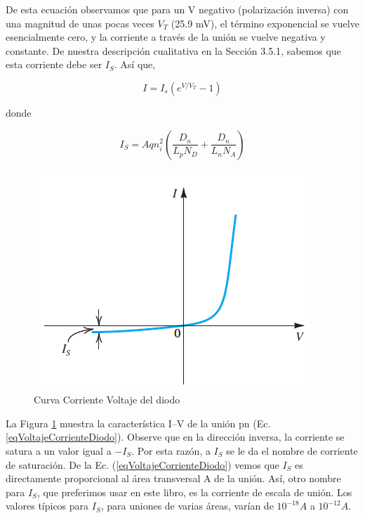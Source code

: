 De esta ecuación observamos que para un V negativo (polarización inversa) con una magnitud de unas pocas veces \(V_T\) (25.9 mV), el término exponencial se vuelve esencialmente cero, y la corriente a través de la unión se vuelve negativa y constante. De nuestra descripción cualitativa en la Sección 3.5.1, sabemos que esta corriente debe ser \(I_S\). Así que,

\begin{equation}
I = I_s \left( e^{V/V_T} - 1 \right)
\label{eqVoltajeCorrienteDiodo}
\end{equation}

donde

\begin{equation*}
I_S = A q n_i^2 \left( \frac{D_n}{L_p N_D} + \frac{D_n}{L_n N_A} \right)
\end{equation*}

\begin{figure}[H]
    \centering
    \includegraphics[scale=0.6]{Electronica/pn_f6.png}
    \caption{Curva Corriente Voltaje del diodo}
    \label{fig_curva_ID_Diodo}
\end{figure}

La Figura \ref{fig_curva_ID_Diodo} muestra la característica I–V de la unión pn (Ec. \ref{eqVoltajeCorrienteDiodo}). Observe que en la dirección inversa, la corriente se satura a un valor igual a \(-I_S\). Por esta razón, a \(I_S\) se le da el nombre de corriente de saturación. De la Ec. (\ref{eqVoltajeCorrienteDiodo}) vemos que \(I_S\) es directamente proporcional al área transversal A de la unión. Así, otro nombre para \(I_S\), que preferimos usar en este libro, es la corriente de escala de unión. Los valores típicos para \(I_S\), para uniones de varias áreas, varían de \(10^{-18} A\) a \(10^{-12} A\).

